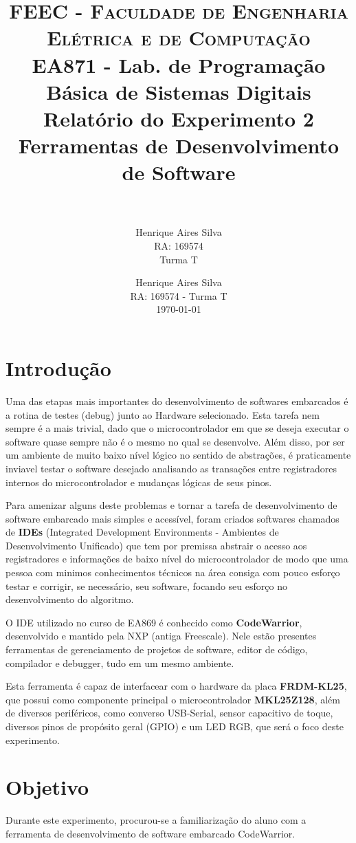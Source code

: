 \documentclass{article}
\author{Henrique Aires Silva \\RA: 169574 \\ Turma T}
\title{
  \usefont{OT1}{bch}{b}{n}
  \normalfont \normalsize \textsc{FEEC - Faculdade de Engenharia Elétrica e de Computação} \\
  \normalfont \normalsize EA871 - Lab. de Programação Básica de Sistemas Digitais
  \horrule{0.5pt} \\[1.0cm]
  \LARGE \textbf{Relatório do Experimento 2\\Ferramentas de Desenvolvimento de Software} \\[1.0cm]
  \horrule{2pt} \\[0.1cm]
}
\author{
  \normalfont 								\normalsize
  Henrique Aires Silva\\ \normalfont \normalsize RA: 169574 - Turma T\\[-3pt]		\normalsize
  \today
}
\date{}
\begin{document}
\maketitle

\section{Introdução}
Uma das etapas mais importantes do desenvolvimento de softwares embarcados é a rotina de testes (debug) junto ao Hardware selecionado. Esta tarefa nem sempre é a mais trivial, dado que o microcontrolador em que se deseja executar o software quase sempre não é o mesmo no qual se desenvolve. Além disso, por ser um ambiente de muito baixo nível lógico no sentido de abstrações, é praticamente inviavel testar o software desejado analisando as transações entre registradores internos do microcontrolador e mudanças lógicas de seus pinos.

Para amenizar alguns deste problemas e tornar a tarefa de desenvolvimento de software embarcado mais simples e acessível, foram criados softwares chamados de \textbf{IDEs} (Integrated Development Environments - Ambientes de Desenvolvimento Unificado) que tem por premissa abstrair o acesso aos registradores e informações de baixo nível do microcontrolador de modo que uma pessoa com minimos conhecimentos técnicos na área consiga com pouco esforço testar e corrigir, se necessário, seu software, focando seu esforço no desenvolvimento do algoritmo.

O IDE utilizado no curso de EA869 é conhecido como \textbf{CodeWarrior}, desenvolvido e mantido pela NXP (antiga Freescale). Nele estão presentes ferramentas de gerenciamento de projetos de software, editor de código, compilador e debugger, tudo em um mesmo ambiente.

Esta ferramenta é capaz de interfacear com o hardware da placa \textbf{FRDM-KL25}, que possui como componente principal o microcontrolador \textbf{MKL25Z128}, além de diversos periféricos, como converso USB-Serial, sensor capacitivo de toque, diversos pinos de propósito geral (GPIO) e um LED RGB, que será o foco deste experimento.

\section{Objetivo}

Durante este experimento, procurou-se a familiarização do aluno com a ferramenta de desenvolvimento de software embarcado CodeWarrior.
\end{document}
